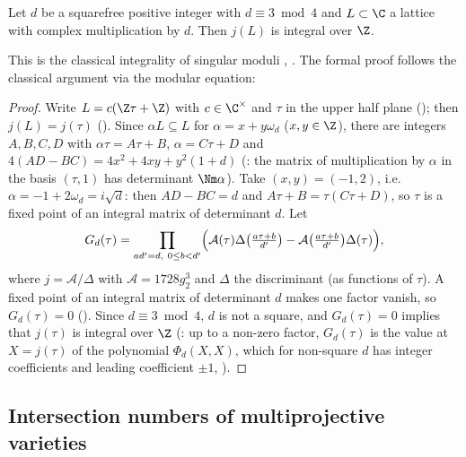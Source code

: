 \begin{theorem}\label{pf:sh-misc:cm1}
Let $d$ be a squarefree positive integer with $d\equiv3\bmod4$ and $L\subset\C$ a lattice with complex multiplication by $d$. Then $j(L)$ is
integral over $\Z$.
\end{theorem}

This is the classical integrality of singular moduli \cite[Ch.~II, Thm.~6.1]{Silverman1994}, \cite[\S11]{Cox1989}. The formal proof
follows the classical argument via the modular equation:

\begin{proof}
Write $L=c(\Z\tau+\Z)$ with $c\in\C^\times$ and $\tau$ in the upper half plane ();
then $j(L)=j(\tau)$ (). Since $\alpha L\subseteq L$ for $\alpha=x+y\omega_d$
($x,y\in\Z$), there are integers $A,B,C,D$ with $\alpha\tau=A\tau+B$, $\alpha=C\tau+D$ and
$4(AD-BC)=4x^2+4xy+y^2(1+d)$ (: the matrix of multiplication by $\alpha$ in the basis
$(\tau,1)$ has determinant $\Nm\alpha$). Take $(x,y)=(-1,2)$, i.e.\ $\alpha=-1+2\omega_d=i\sqrt d$: then $AD-BC=d$ and $A\tau+B=\tau(C\tau+D)$, so
$\tau$ is a fixed point of an integral matrix of determinant $d$. Let
\[
G_d(\tau)=\prod_{ad'=d,\ 0\le b<d'}\Bigl(\mathcal A(\tau)\Delta\bigl(\tfrac{a\tau+b}{d'}\bigr)-\mathcal A\bigl(\tfrac{a\tau+b}{d'}\bigr)\Delta(\tau)\Bigr),
\]
where $j=\mathcal A/\Delta$ with $\mathcal A=1728g_2^3$ and $\Delta$ the discriminant (as functions of $\tau$). A fixed point of an integral matrix of
determinant $d$ makes one factor vanish, so $G_d(\tau)=0$ (). Since $d\equiv3\bmod4$, $d$
is not a square, and $G_d(\tau)=0$ implies that $j(\tau)$ is integral over $\Z$
(: up to a non-zero factor, $G_d(\tau)$ is the value at $X=j(\tau)$ of the
polynomial $\Phi_d(X,X)$, which for non-square $d$ has integer coefficients and leading coefficient $\pm1$, \cite[\S11]{Cox1989}).
\end{proof}

\subsection{Intersection numbers of multiprojective varieties}\label{sec:pf:sh-misc:intnum}

